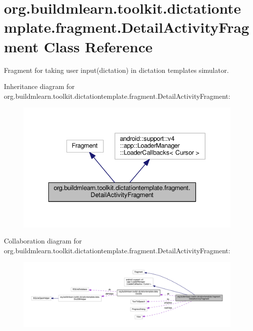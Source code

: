 \hypertarget{classorg_1_1buildmlearn_1_1toolkit_1_1dictationtemplate_1_1fragment_1_1DetailActivityFragment}{}\section{org.\+buildmlearn.\+toolkit.\+dictationtemplate.\+fragment.\+Detail\+Activity\+Fragment Class Reference}
\label{classorg_1_1buildmlearn_1_1toolkit_1_1dictationtemplate_1_1fragment_1_1DetailActivityFragment}


Fragment for taking user input(dictation) in dictation template\textquotesingle{}s simulator.  




Inheritance diagram for org.\+buildmlearn.\+toolkit.\+dictationtemplate.\+fragment.\+Detail\+Activity\+Fragment\+:
\nopagebreak
\begin{figure}[H]
\begin{center}
\leavevmode
\includegraphics[width=328pt]{classorg_1_1buildmlearn_1_1toolkit_1_1dictationtemplate_1_1fragment_1_1DetailActivityFragment__inherit__graph}
\end{center}
\end{figure}


Collaboration diagram for org.\+buildmlearn.\+toolkit.\+dictationtemplate.\+fragment.\+Detail\+Activity\+Fragment\+:
\nopagebreak
\begin{figure}[H]
\begin{center}
\leavevmode
\includegraphics[width=350pt]{classorg_1_1buildmlearn_1_1toolkit_1_1dictationtemplate_1_1fragment_1_1DetailActivityFragment__coll__graph}
\end{center}
\end{figure}
